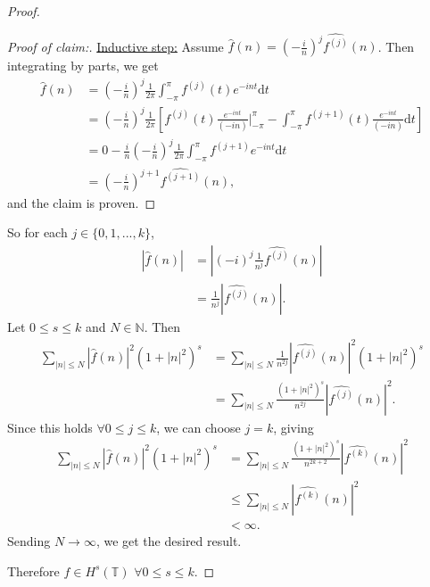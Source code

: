 \documentclass{article}
\newcommand{\N}{\mathbb{N}} %
\begin{document}
\begin{proof}
\begin{proof}[Proof of claim:]
		\underline{Inductive step:} Assume $\hat{f}(n) = \left(-\frac{i}{n}\right)^j \hat{f^{(j)}}(n)$. Then integrating by parts, we get
		\begin{align}
			\hat{f}(n) &= \left(-\frac{i}{n}\right)^j\frac{1}{2 \pi} \int_{-\pi}^\pi f^{(j)}(t) e^{-int} \mathrm{d}t \\
			&= \left(-\frac{i}{n}\right)^j\frac{1}{2 \pi}\left[f^{(j)}(t) \frac{e^{-int}}{(-in)} \Big|_{-\pi}^\pi - \int_{-\pi}^\pi f^{(j+1)}(t)\frac{e^{-int}}{(-in)} \mathrm{d}t\right] \\
			&= 0 - \frac{i}{n}\left(-\frac{i}{n}\right)^j \frac{1}{2\pi} \int_{-\pi}^\pi f^{(j+1)}e^{-int} \mathrm{d}t \\
			&= \left(-\frac{i}{n}\right)^{j+1} \widehat{f^{(j+1)}}(n),
		\end{align} 
		and the claim is proven.
	\end{proof}
	So for each $j \in \{0, 1, ..., k\}$, 
	\begin{align}
		\left|\hat{f}(n)\right| &= \left|\left(-i\right)^j \frac{1}{n^j} \widehat{f^{(j)}}(n)\right| \\
		&= \frac{1}{n^j} \left|\widehat{f^{(j)}}(n)\right|.
	\end{align}
	Let $0 \leq s \leq k$ and $N \in \N$. Then
	\begin{align}
		\sum_{|n| \leq N} \left|\hat{f}(n)\right|^2\left(1 + |n|^2\right)^s &= \sum_{|n| \leq N} \frac{1}{n^{2j}} \left|\widehat{f^{(j)}}(n)\right|^2 \left(1 + |n|^2\right)^s \\
		&= \sum_{|n| \leq N} \frac{\left(1 + |n|^2\right)^s}{n^{2j}} \left|\widehat{f^{(j)}}(n)\right|^2.
	\end{align}
	Since this holds $\forall 0 \leq j \leq k$, we can choose $j = k$, giving
	\begin{align}
		\sum_{|n| \leq N} \left|\hat{f}(n)\right|^2\left(1 + |n|^2\right)^s &= \sum_{|n| \leq N} \frac{\left(1 + |n|^2\right)^s}{n^{2k + 2}} \left|\widehat{f^{(k)}}(n)\right|^2\\
		&\leq \sum_{|n| \leq N} \left|\widehat{f^{(k)}}(n)\right|^2 \\
		& < \infty.
	\end{align}
	Sending $N \to \infty$, we get the desired result.
	
	Therefore $f \in H^s(\mathbb{T})$ $\forall 0 \leq s \leq k$.
\end{proof}
\end{document}

